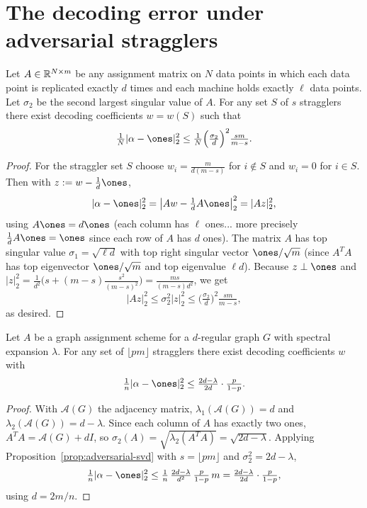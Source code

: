 \chapter{The decoding error under adversarial stragglers}

\begin{proposition}
  \label{prop:adversarial-svd}
  Let $A \in \mathbb{R}^{N \times m}$ be any assignment matrix on $N$ data points in
  which each data point is replicated exactly $d$ times and each machine holds
  exactly $\ell$ data points. Let $\sigma_2$ be the second largest singular value
  of $A$. For any set $S$ of $s$ stragglers there exist decoding coefficients
  $w = w(S)$ such that
  \[
    \tfrac1N|\alpha - \ones|_2^2
      \le \tfrac1N\Big(\tfrac{\sigma_2}{d}\Big)^2 \tfrac{sm}{m-s}.
  \]
\end{proposition}
\begin{proof}
  For the straggler set $S$ choose $w_i = \tfrac{m}{d(m-s)}$ for $i \notin S$ and
  $w_i = 0$ for $i \in S$. Then with $z := w - \tfrac1d\ones$,
  \[
    |\alpha - \ones|_2^2 = \big|Aw - \tfrac1d A\ones\big|_2^2 = |Az|_2^2,
  \]
  using $A\ones = d\ones$ (each column has $\ell$ ones... more precisely
  $\tfrac1d A\ones = \ones$ since each row of $A$ has $d$ ones). The matrix $A$
  has top singular value $\sigma_1 = \sqrt{\ell d}$ with top right singular vector
  $\ones/\sqrt m$ (since $A^TA$ has top eigenvector $\ones/\sqrt m$ and top
  eigenvalue $\ell d$). Because $z \perp \ones$ and
  $|z|_2^2 = \tfrac1{d^2}\big(s + (m-s)\tfrac{s^2}{(m-s)^2}\big)
   = \tfrac{ms}{(m-s)d^2}$, we get
  \[
    |Az|_2^2 \le \sigma_2^2|z|_2^2 \le \Big(\tfrac{\sigma_2}{d}\Big)^2\tfrac{sm}{m-s},
  \]
  as desired.
\end{proof}

\begin{corollary}
  \label{cor:adversarial-graph}
  Let $A$ be a graph assignment scheme for a $d$-regular graph $G$ with spectral
  expansion $\lambda$. For any set of $\lfloor pm\rfloor$ stragglers there exist
  decoding coefficients $w$ with
  \[
    \tfrac1n|\alpha - \ones|_2^2 \le \tfrac{2d-\lambda}{2d}\cdot\tfrac{p}{1-p}.
  \]
\end{corollary}
\begin{proof}
  With $\mathcal{A}(G)$ the adjacency matrix, $\lambda_1(\mathcal{A}(G)) = d$ and
  $\lambda_2(\mathcal{A}(G)) = d - \lambda$. Since each column of $A$ has exactly
  two ones, $A^TA = \mathcal{A}(G) + dI$, so
  $\sigma_2(A) = \sqrt{\lambda_2(A^TA)} = \sqrt{2d - \lambda}$. Applying
  Proposition~\ref{prop:adversarial-svd} with $s = \lfloor pm\rfloor$ and
  $\sigma_2^2 = 2d - \lambda$,
  \[
    \tfrac1n|\alpha - \ones|_2^2
      \le \tfrac1n\,\tfrac{2d-\lambda}{d^2}\,\tfrac{p}{1-p}\,m
      = \tfrac{2d-\lambda}{2d}\cdot\tfrac{p}{1-p},
  \]
  using $d = 2m/n$.
\end{proof}

